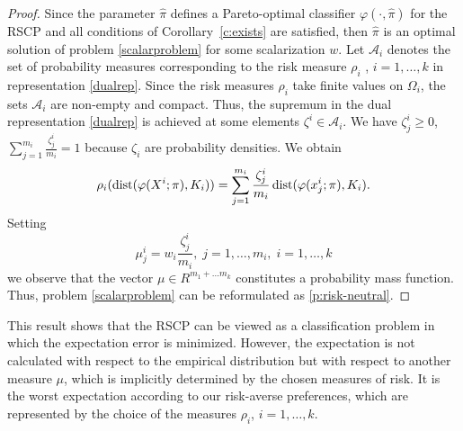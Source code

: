 \documentclass[10pt,letterpaper]{article}
\newcommand{\Ac}{\mathcal{A}}
\newcommand{\1}{1{\hskip -2.55 pt}\hbox{I}}
\newcommand{\dist}{\mathop{\rm dist}}
\newtheorem{proof}{Proof}
\begin{document}
\begin{proof}
Since the parameter $\hat{\pi}$  defines a Pareto-optimal classifier $\varphi(\cdot, \hat{\pi})$ for the RSCP and all conditions of Corollary~\ref{c:exists} are satisfied, then $\hat{\pi}$ is an optimal solution of problem \eqref{scalarproblem} for some scalarization $w$.
Let $\Ac_i$ denotes the set of probability measures corresponding to the risk measure $\rho_i$ , $i=1,\dots, k$ in representation
\eqref{dualrep}. 
Since the risk measures $\rho_i$ take finite values on $\varOmega_i$, the sets $\Ac_i$ are non-empty and compact. Thus, the supremum in the dual representation \eqref{dualrep} is achieved at some elements $\zeta^i\in\Ac_i$. We have  $\zeta^i_j\geq 0$, $\sum_{j=1}^{m_i} \frac{\zeta^i_j}{m_i} =1$ because 
$\zeta_i$ are probability densities. We obtain
\[
\rho_i(\dist(\varphi(X^i;\pi),K_i)) = \sum_{j=1}^{m_i} \frac{\zeta^i_j}{m_i} \dist(\varphi(x^i_j;\pi),K_i).
\]
Setting
\[
\mu^i_j=w_i\frac{\zeta^i_j}{m_i},\; j=1,\dots, m_i,\; i=1,\dots, k
\]
we observe that the vector $\mu\in R^{m_1+\dots m_k}$ constitutes a probability mass function.
Thus, problem \eqref{scalarproblem} can be reformulated as \eqref{p:risk-neutral}.
\end{proof}

This result shows that the RSCP can be viewed as a classification problem in which the expectation error is minimized. However, the expectation is not calculated with respect to the empirical distribution but with respect to another measure $\mu$, which is implicitly determined by the chosen measures of risk. 
It is the worst expectation according to our risk-averse preferences, which are represented by the choice of the measures $\rho_i$, $i=1,\dots, k.$ 
\end{document}
